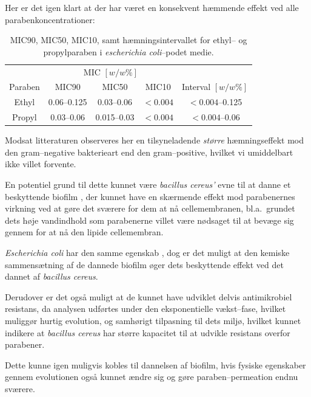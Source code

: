     Her er det igen klart at der har været en konsekvent hæmmende effekt ved alle parabenkoncentrationer:
    \begin{table}[H]\centering
        \caption{MIC90, MIC50, MIC10, samt hæmningsintervallet for ethyl-- og propylparaben i \textit{escherichia coli}--podet medie.}
        \begin{tabular}{ccccc}
            \toprule
            & \multicolumn{3}{c}{MIC $\left[\si{w\per w \%}\right]$} & \\
            \cmidrule(r){2-4}
            Paraben & MIC90 & MIC50 & MIC10 & Interval $\left[\si{w\per w \%}\right]$ \\
            \midrule
            Ethyl & 0.06--0.125 & 0.03--0.06 & $<0.004$ & $<0.004$--0.125 \\
            Propyl & 0.03--0.06 & 0.015--0.03 & $<0.004$ & $<0.004$--0.06 \\
            \bottomrule
        \end{tabular}
    \end{table}
    Modsat litteraturen observeres her en tilsyneladende \textit{større} hæmningseffekt mod den gram--negative bakterieart end den gram--positive, hvilket vi umiddelbart ikke villet forvente. 

    En potentiel grund til dette kunnet være \textit{bacillus cereus'} evne til at danne et beskyttende biofilm \parencite{Joaq2020,Mich2021}, der kunnet have en skærmende effekt mod parabenernes virkning ved at gøre det sværere for dem at nå cellemembranen, bl.a.\ grundet dets høje vandindhold \parencite{Sati2023} som parabenerne villet være nødsaget til at bevæge sig gennem for at nå den lipide cellemembran. 

    \textit{Escherichia coli} har den samme egenskab \parencite{Chri2010}, dog er det muligt at den kemiske sammensætning af de dannede biofilm øger dets beskyttende effekt ved det dannet af \textit{bacillus cereus}. 

    Derudover er det også muligt at de kunnet have udviklet delvis antimikrobiel resistans, da analysen udførtes under den eksponentielle vækst--fase, hvilket muliggør hurtig evolution, og samhørigt tilpasning til dets miljø, hvilket kunnet indikere at \textit{bacillus cereus} har større kapacitet til at udvikle resistans overfor parabener. 

    Dette kunne igen muligvis kobles til dannelsen af biofilm, hvis fysiske egenskaber gennem evolutionen også kunnet ændre sig og gøre paraben--permeation endnu sværere.
